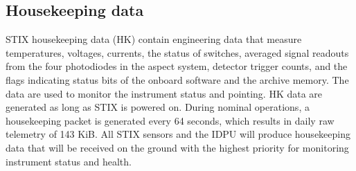 \documentclass[referee]{aa} %
\begin{document}
\subsection{Housekeeping data}
STIX housekeeping data (HK) contain engineering data that measure temperatures, voltages, currents, the status of switches,
averaged signal readouts from the four photodiodes in the aspect system, detector trigger counts, and the flags indicating
status bits of the onboard software and the archive memory.
The data are used to monitor the instrument status and  pointing.
HK data are generated as long as STIX is powered on.
During nominal operations, a housekeeping packet is generated every 64 seconds, which results in daily raw telemetry of  143 KiB.
All STIX sensors and the IDPU will produce housekeeping data that will be received on the ground with the highest priority
for monitoring instrument status and health.
\end{document}
